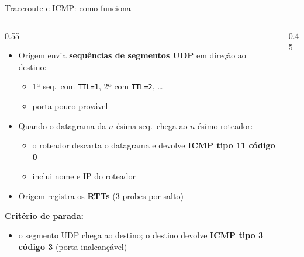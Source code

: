 \documentclass[aspectratio=169,11pt]{beamer}
\begin{document}
\begin{frame}{Traceroute e ICMP: como funciona}
  \begin{columns}
    \begin{column}{0.55\textwidth}
      \begin{itemize}
        \item Origem envia \textbf{sequências de segmentos UDP} em direção ao destino:
          \begin{itemize}
            \item 1ª seq.\ com \texttt{TTL=1}, 2ª com \texttt{TTL=2}, \ldots
            \item porta pouco provável
          \end{itemize}
        \item Quando o datagrama da $n$-ésima seq.\ chega ao $n$-ésimo roteador:
          \begin{itemize}
            \item o roteador descarta o datagrama e devolve \textbf{ICMP tipo 11 código 0}
            \item inclui nome e IP do roteador
          \end{itemize}
        \item Origem registra os \textbf{RTTs} (3 probes por salto)
      \end{itemize}
      \textbf{Critério de parada:}
      \begin{itemize}
        \item o segmento UDP chega ao destino; o destino devolve \textbf{ICMP tipo 3 código 3} (porta inalcançável)
      \end{itemize}
    \end{column}
    \begin{column}{0.45\textwidth}
      \begin{center}
\end{center}
\end{column}
\end{columns}
\end{frame}
\end{document}
